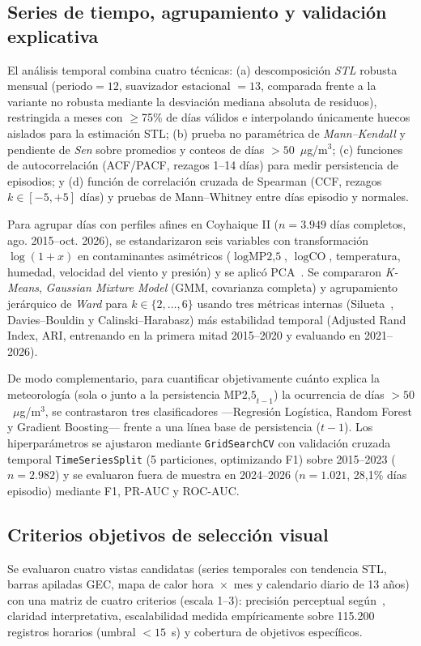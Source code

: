 \documentclass[conference]{IEEEtran}
\begin{document}
\subsection{Series de tiempo, agrupamiento y validaci{\'o}n explicativa}
El an{\'a}lisis temporal combina cuatro t{\'e}cnicas: (a) descomposici{\'o}n \textit{STL} robusta mensual ($\text{periodo}=12$, suavizador estacional $=13$, comparada frente a la variante no robusta mediante la desviaci{\'o}n mediana absoluta de residuos), restringida a meses con $\geq$75\% de d{\'i}as v{\'a}lidos e interpolando {\'u}nicamente huecos aislados para la estimaci{\'o}n STL; (b) prueba no param{\'e}trica de \textit{Mann--Kendall} y pendiente de \textit{Sen} sobre promedios y conteos de d{\'i}as $>50$~$\mu$g/m$^3$; (c) funciones de autocorrelaci{\'o}n (ACF/PACF, rezagos 1--14 d{\'i}as) para medir persistencia de episodios; y (d) funci{\'o}n de correlaci{\'o}n cruzada de Spearman (CCF, rezagos $k\in[-5,+5]$ d{\'i}as) y pruebas de Mann--Whitney entre d{\'i}as episodio y normales.

Para agrupar d{\'i}as con perfiles afines en Coyhaique II ($n=3.949$ d{\'i}as completos, ago. 2015--oct. 2026), se estandarizaron seis variables con transformaci{\'o}n $\log(1+x)$ en contaminantes asim{\'e}tricos ($\log\text{MP2,5}$, $\log\text{CO}$, temperatura, humedad, velocidad del viento y presi{\'o}n) y se aplic{\'o} PCA~\cite{jolliffe2016}. Se compararon \textit{K-Means}, \textit{Gaussian Mixture Model} (GMM, covarianza completa) y agrupamiento jer{\'a}rquico de \textit{Ward} para $k\in\{2,\dots,6\}$ usando tres m{\'e}tricas internas (Silueta~\cite{rousseeuw1987}, Davies--Bouldin y Calinski--Harabasz) m{\'a}s estabilidad temporal (Adjusted Rand Index, ARI, entrenando en la primera mitad 2015--2020 y evaluando en 2021--2026).

De modo complementario, para cuantificar objetivamente cu{\'a}nto explica la meteorolog{\'i}a (sola o junto a la persistencia $\text{MP2,5}_{t-1}$) la ocurrencia de d{\'i}as $>50$~$\mu$g/m$^3$, se contrastaron tres clasificadores ---Regresi{\'o}n Log{\'i}stica, Random Forest y Gradient Boosting--- frente a una l{\'i}nea base de persistencia ($t-1$). Los hiperpar{\'a}metros se ajustaron mediante \texttt{GridSearchCV} con validaci{\'o}n cruzada temporal \texttt{TimeSeriesSplit} (5 particiones, optimizando F1) sobre 2015--2023 ($n=2.982$) y se evaluaron fuera de muestra en 2024--2026 ($n=1.021$, 28,1\% d{\'i}as episodio) mediante F1, PR-AUC y ROC-AUC.

\subsection{Criterios objetivos de selecci{\'o}n visual}
Se evaluaron cuatro vistas candidatas (series temporales con tendencia STL, barras apiladas GEC, mapa de calor hora~$\times$~mes y calendario diario de 13 a{\~n}os) con una matriz de cuatro criterios (escala 1--3): precisi{\'o}n perceptual seg{\'u}n~\cite{cleveland1984}, claridad interpretativa, escalabilidad medida emp{\'i}ricamente sobre 115.200 registros horarios (umbral $<15$~s) y cobertura de objetivos espec{\'i}ficos.
\end{document}
